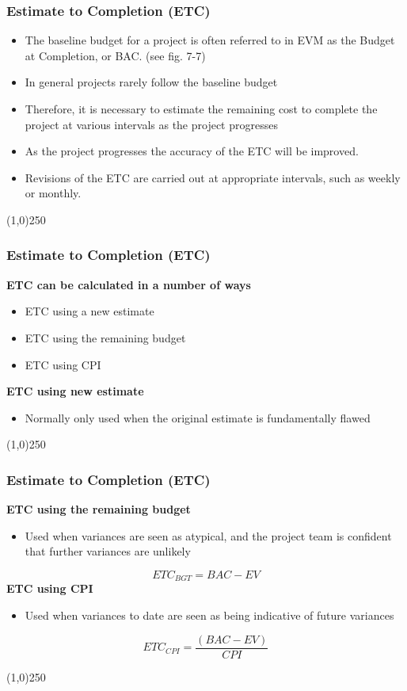 \begin{frame}
\frametitle{Estimate to Completion (ETC)}
\begin{itemize}
	\item The baseline budget for a project is often referred to in EVM as the Budget at Completion, or BAC. (see fig. 7-7) 
	\item In general projects rarely follow the baseline budget
	\item Therefore, it is necessary to estimate the remaining cost to complete the project at various intervals as the project progresses
	\item As the project progresses the accuracy of the ETC will be improved.
	\item Revisions of the ETC are carried out at appropriate intervals, such as weekly or monthly.
\end{itemize}
\end{frame}
\begin{center}\line(1,0){250}\end{center}





\begin{frame}
\frametitle{Estimate to Completion (ETC)}
\textbf{ETC can be calculated in a number of ways}
\begin{itemize}
	\item ETC using a new estimate
	\item ETC using the remaining budget
	\item ETC using CPI
\end{itemize}
\textbf{ETC using new estimate}
\begin{itemize}
	\item Normally only used when the original estimate is fundamentally flawed
\end{itemize}
\end{frame}
\begin{center}\line(1,0){250}\end{center}







\begin{frame}
\frametitle{Estimate to Completion (ETC)}
\textbf{ETC using the remaining budget}
\begin{itemize}
	\item Used when variances are seen as atypical, and the project team is confident that further variances are unlikely
\end{itemize}
\[
		ETC_{BGT} = BAC - EV
\]
\textbf{ETC using CPI}
\begin{itemize}
	\item Used when variances to date are seen as being indicative of future variances
\end{itemize}
\[
		ETC_{CPI} = \frac{(BAC - EV)}{CPI}
\]
\end{frame}
\begin{center}\line(1,0){250}\end{center}






